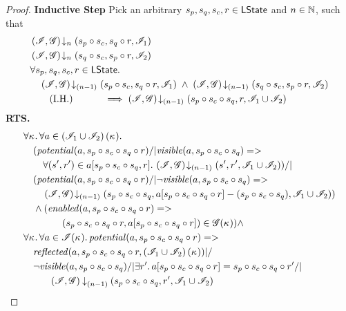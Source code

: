 \begin{lemma}
\begin{proof}
\noindent\textbf{Inductive Step} Pick an arbitrary $s_p, s_q, s_c, r \in \textsf{LState}$ and $n \in \mathbb{N}$, such that
%
\begin{align}
	& \left(\mathscr{I}, \mathscr{G}\right) \!\downarrow_{n} \left(s_p \circ s_c, s_q \circ r, \mathscr{I}_{1}\right) \label{LMC:Ass1}\\
	& \left(\mathscr{I}, \mathscr{G}\right) \!\downarrow_{n} \left(s_q \circ s_c, s_p \circ r, \mathscr{I}_{2}\right) \label{LMC:Ass2}\\
	& \forall s_p, s_q, s_c, r \in \textsf{LState}.\, \nonumber \\
	&	\quad \left(\mathscr{I}, \mathscr{G}\right) \!\downarrow_{(n-1)} \left(s_p \circ s_c, s_q \circ r, \mathscr{I}_{1}\right) \;\land\; \left(\mathscr{I}, \mathscr{G}\right) \!\downarrow_{(n-1)} \left(s_q \circ s_c, s_p \circ r, \mathscr{I}_{2}\right) \nonumber \\
	&	\tag{I.H.} \qquad\quad\implies  \left(\mathscr{I}, \mathscr{G}\right) \!\downarrow_{(n-1)} \left(s_p \circ s_c \circ s_q, r, \mathscr{I}_{1} \cup \mathscr{I}_{2}\right) \label{LMC:IH}
\end{align}
%
%
\noindent\textbf{RTS.}
%
\begin{align}
	& 
	\V{\ca{}}  \V{a \in \left(\lmod_{1} \cup \lmod_{2}\right)(\ca{})} \nonumber \\
  &\quad(\m{potential}(a,s_p \composeL s_c \composeL s_q \composeL r) /| \m{visible}(a,s_p \composeL s_c \composeL s_q)=> \nonumber \\
  &\qquad \for{(s', r') \in a[s_p \composeL s_c \composeL s_q , r]} \extendsAMUpto{\lmod, \gmod}{(n-1)}{s'}{r'}{\lmod_{1} \cup \lmod_{2}}) /| \label{LMC:Goal0}\\
%    
  &\quad(\m{potential}(a,s_p \composeL s_c \composeL s_q \composeL r) /| \neg \m{visible}(a,s_p \composeL s_c \composeL s_q) => \nonumber \\
  &\qquad \extendsAMUpto{\lmod, \gmod}{(n-1)}{s_p \composeL s_c \composeL s_q}{a[s_p \composeL s_c \composeL s_q \composeL r] - (s_p \composeL s_c \composeL s_q)}{\lmod_{1} \cup \lmod_{2}}) \label{LMC:Goal1}\\
%    
  &\quad\land(\m{enabled}(a,s_p \composeL s_c \composeL s_q \composeL r) => \nonumber\\
  &\qquad\qquad (s_p \composeL s_c \composeL s_q  \composeL r, a[s_p \composeL s_c \composeL s_q  \composeL r])\in \gmod(\ca{})) \land\label{LMC:Goal2}\\
%  
  &\V{\ca{}}\V{a\in \lmod(\ca{})}
  \m{potential}(a,s_p \composeL s_c \composeL s_q \composeL r) =>\null \nonumber \\
  &\quad \m{reflected}(a,s_p \composeL s_c \composeL s_q \composeL r,\left(\lmod_{1} \cup \lmod_{2}\right)(\ca{})) |/\null \nonumber \\
%  
  &\quad \neg\m{visible}(a,s_p \composeL s_c \composeL s_q) /| \exsts{r'}a[s_p \composeL s_c \composeL s_q \composeL r] = s_p \composeL s_c \composeL s_q \composeL r' /| \nonumber\\
  &\hspace{1cm}\extendsAMUptob{\lmod, \gmod}{(n-1)}{s_p \composeL s_c \composeL s_q, r'}{\lmod_{1} \cup \lmod_{2}} \label{LMC:Goal3}
\end{align}
%
%


\end{proof}
\end{lemma}
